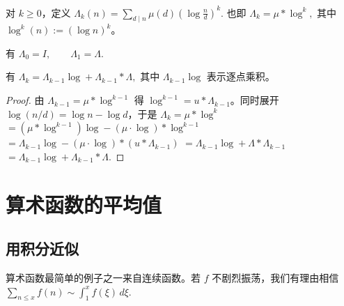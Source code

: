 \begin{definition}
	对 $k\geq 0$，定义
	\(\textstyle \Lambda_k(n) =\allowbreak{} \sum_{d\mid\allowbreak{} n}\mu(d)\left(\log\frac nd\right)^k.\)
	也即
	\(\textstyle \Lambda_k=\allowbreak{}\mu*\log^k,\allowbreak{}\)
	其中 $\log^k(n):=(\log n)^k$。
\end{definition}

\begin{remark}
	有
	\(\textstyle \Lambda_0=\allowbreak{}I,\allowbreak{}\qquad \Lambda_1=\allowbreak{}\Lambda.\)
\end{remark}

\begin{theorem}
	有
	\(\textstyle \Lambda_k =\allowbreak{} \Lambda_{k-1}\log+\allowbreak{}\Lambda_{k-1}*\Lambda,\allowbreak{}\)
	其中 $\Lambda_{k-1}\log$ 表示逐点乘积。
\end{theorem}

\begin{proof}
	由 $\Lambda_{k-1}=\mu*\log^{k-1}$ 得 $\log^{k-1}=u*\Lambda_{k-1}$。同时展开 $\log(n/d)=\log n-\log d$，于是
	\(\textstyle \Lambda_k =\allowbreak{}\mu*\log^k\) \(\textstyle =\allowbreak{}(\mu*\log^{k-1})\log-(\mu\cdot\log)*\log^{k-1}\) \(\textstyle =\allowbreak{}\Lambda_{k-1}\log-(\mu\cdot\log)*(u*\Lambda_{k-1})\) \(\textstyle =\allowbreak{}\Lambda_{k-1}\log+\allowbreak{}\Lambda*\Lambda_{k-1}\) \(\textstyle =\allowbreak{}\Lambda_{k-1}\log+\allowbreak{}\Lambda_{k-1}*\Lambda.\)
\end{proof}





\chapter{算术函数的平均值}


\section{用积分近似}


算术函数最简单的例子之一来自连续函数。若 $f$ 不剧烈振荡，我们有理由相信
\(\textstyle \sum_{n\leq\allowbreak{} x}f(n)\sim\allowbreak{} \int_1^x f(\xi)\,d\xi.\)

